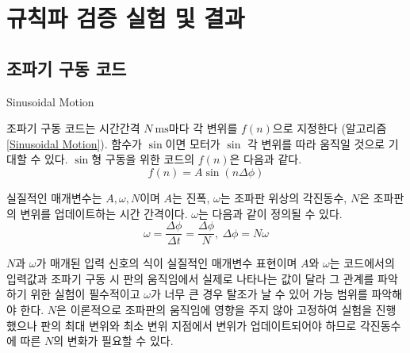 \section{규칙파 검증 실험 및 결과}

\subsection{조파기 구동 코드}

\begin{algorithm}[h]
    \caption{Sinusoidal Motion}
    \label{Sinusoidal Motion}
    \begin{algorithmic}[1]
            \EndIf
        \EndFor
        \EndProcedure
    \end{algorithmic}
\end{algorithm}

조파기 구동 코드는 시간간격 $N~\mathrm{ms}$마다 각 변위를 $f(n)$으로 지정한다 (알고리즘 \ref{Sinusoidal Motion}). 함수가 $\sin$이면 모터가 $\sin$ 각 변위를 따라 움직일 것으로 기대할 수 있다. $\sin$형 구동을 위한 코드의 $f(n)$은 다음과 같다.
\begin{equation}
    f(n) = A \sin(n \Delta\phi)
    \label{f(n)}
\end{equation}

실질적인 매개변수는 $A, \omega, N$이며 $A$는 진폭, $\omega$는 조파판 위상의 각진동수, $N$은 조파판의 변위를 업데이트하는 시간 간격이다. $\omega$는 다음과 같이 정의될 수 있다.
\begin{equation}
    \omega = \frac{\Delta\phi}{\Delta t} = \frac{\Delta\phi}{N}, ~\Delta\phi = N \omega
    \label{f(N)}
\end{equation}

$N$과 $\omega$가 매개된 입력 신호의 식이 실질적인 매개변수 표현이며 $A$와 $\omega$는 코드에서의 입력값과 조파기 구동 시 판의 움직임에서 실제로 나타나는 값이 달라 그 관계를 파악하기 위한 실험이 필수적이고 $\omega$가 너무 큰 경우 탈조가 날 수 있어 가능 범위를 파악해야 한다. $N$은 이론적으로 조파판의 움직임에 영향을 주지 않아 고정하여 실험을 진행했으나 판의 최대 변위와 최소 변위 지점에서 변위가 업데이트되어야 하므로 각진동수에 따른 $N$의 변화가 필요할 수 있다.

